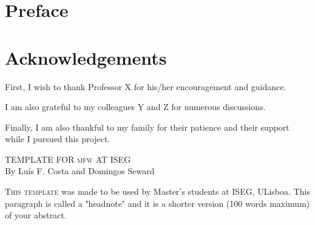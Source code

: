 \documentclass [12pt,a4paper,oneside]{article}
\begin{document}
	\newpage %
	\thispagestyle{plain}%
\section*{Preface}


	\newpage %
	\thispagestyle{plain}%
\section*{Acknowledgements}

First, I wish to thank Professor X for his/her encouragement and guidance.

I am also grateful to my colleagues Y and Z for numerous discussions.

Finally, I am also thankful to my family for their patience and their support while I pursued this project.


	\newpage %
	\thispagestyle{plain}%
	
	\setcounter{page}{1} %
	
\begin{center} %

\textsc{TEMPLATE FOR \gls{mfw} AT ISEG}\\ %
    
\vspace{0.5cm} %
By Luís F. Costa and Domingos Seward\\
    
\begingroup\singlespacing %
\begin{changemargin}{2cm}{2cm} %
{\footnotesize \textsc{This template} was made to be used by Master's students at ISEG, ULisboa. This paragraph is called a "headnote" and it is a shorter version (100 words maximum) of your abstract.}
\end{changemargin}
\endgroup

\end{center} %
\end{document}
